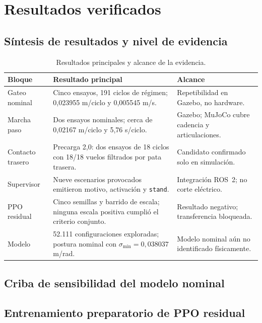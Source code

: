 \chapter{Resultados verificados}

\section{Síntesis de resultados y nivel de evidencia}

\begin{table}[H]
\centering
\caption{Resultados principales y alcance de la evidencia.}
\label{tab:sintesis-resultados}
\small
\begin{tabular}{p{}p{}p{}}
\toprule
Bloque & Resultado principal & Alcance \\
\midrule
Gateo nominal & Cinco ensayos, 191 ciclos de régimen; 0,023955 m/ciclo y 0,005545 m/s. & Repetibilidad en Gazebo, no hardware. \\
Marcha paso & Dos ensayos nominales; cerca de 0,02167 m/ciclo y 5,76 s/ciclo. & Gazebo; MuJoCo cubre cadencia y articulaciones. \\
Contacto trasero & Precarga 2,0: dos ensayos de 18 ciclos con 18/18 vuelos filtrados por pata trasera. & Candidato confirmado solo en simulación. \\
Supervisor & Nueve escenarios provocados emitieron motivo, activación y \texttt{stand}. & Integración ROS~2; no corte eléctrico. \\
PPO residual & Cinco semillas y barrido de escala; ninguna escala positiva cumplió el criterio conjunto. & Resultado negativo; transferencia bloqueada. \\
Modelo & 52.111 configuraciones exploradas; postura nominal con $\sigma_{\min}=0{,}038037$ m/rad. & Modelo nominal aún no identificado físicamente. \\
\bottomrule
\end{tabular}
\end{table}

\section{Criba de sensibilidad del modelo nominal}

\section{Entrenamiento preparatorio de PPO residual}


